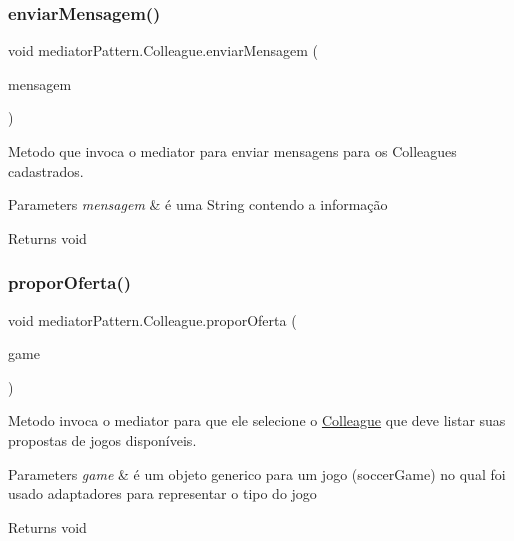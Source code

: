 \subsubsection{\texorpdfstring{enviarMensagem()}{enviarMensagem()}}
{\footnotesize\ttfamily void mediator\+Pattern.\+Colleague.\+enviar\+Mensagem (\begin{DoxyParamCaption}\item[{String}]{mensagem }\end{DoxyParamCaption})}



Metodo que invoca o mediator para enviar mensagens para os Colleagues cadastrados. 


\begin{DoxyParams}{Parameters}
{\em mensagem} & é uma String contendo a informação \\
\hline
\end{DoxyParams}
\begin{DoxyReturn}{Returns}
void 
\end{DoxyReturn}
\mbox{\label{classmediator_pattern_1_1_colleague_ae661501777728adf280e9c5b447d99a2}} 
\subsubsection{\texorpdfstring{proporOferta()}{proporOferta()}}
{\footnotesize\ttfamily void mediator\+Pattern.\+Colleague.\+propor\+Oferta (\begin{DoxyParamCaption}\item[{\mbox{\hyperlink{classtemplate_pattern_1_1soccer_game}{soccer\+Game}}}]{game }\end{DoxyParamCaption})}



Metodo invoca o mediator para que ele selecione o \mbox{\hyperlink{classmediator_pattern_1_1_colleague}{Colleague}} que deve listar suas propostas de jogos disponíveis. 


\begin{DoxyParams}{Parameters}
{\em game} & é um objeto generico para um jogo (soccer\+Game) no qual foi usado adaptadores para representar o tipo do jogo \\
\hline
\end{DoxyParams}
\begin{DoxyReturn}{Returns}
void 
\end{DoxyReturn}
\mbox{\label{classmediator_pattern_1_1_colleague_ad18791118d9a9897252bc68f4a7ee045}} 
